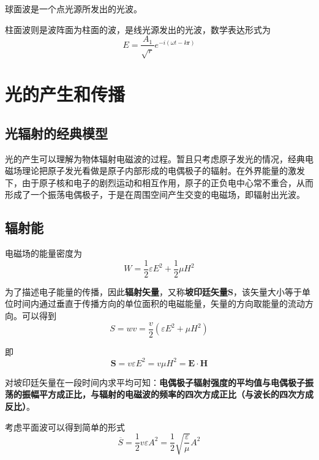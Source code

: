 \documentclass[UTF8]{ctexart}
\begin{document}
\noindent 球面波是一个点光源所发出的光波。

	柱面波则是波阵面为柱面的波，是线光源发出的光波，数学表达形式为
	\begin{equation}
		E=\frac{A_{1}}{\sqrt{r}} e^{-i(\omega t-k \boldsymbol{r})}
	\end{equation}
	
	\section{光的产生和传播}
	
	\subsection{光辐射的经典模型}
	光的产生可以理解为物体辐射电磁波的过程。暂且只考虑原子发光的情况，经典电磁场理论把原子发光看做是原子内部形成的电偶极子的辐射。在外界能量的激发下，由于原子核和电子的剧烈运动和相互作用，原子的正负电中心常不重合，从而形成了一个振荡电偶极子，于是在周围空间产生交变的电磁场，即辐射出光波。
	
	\subsection{辐射能}
	电磁场的能量密度为
	\begin{equation}
	W=\frac{1}{2} \varepsilon E^{2}+\frac{1}{2} \mu H^{2}
	\end{equation}
	
	为了描述电子能量的传播，因此\textbf{辐射矢量}，又称\textbf{坡印廷矢量S}，该矢量大小等于单位时间内通过垂直于传播方向的单位面积的电磁能量，矢量的方向取能量的流动方向。可以得到
	\begin{equation}
	S=w v=\frac{v}{2}\left(\varepsilon E^{2}+\mu H^{2}\right)
	\end{equation}
	
\noindent 即
\begin{equation}
\boldsymbol{S}=v \varepsilon E^{2}=v \mu H^{2}=\boldsymbol{E} \cdot \boldsymbol{H}
\end{equation}

	对坡印廷矢量在一段时间内求平均可知：\textbf{电偶极子辐射强度的平均值与电偶极子振荡的振幅平方成正比，与辐射的电磁波的频率的四次方成正比（与波长的四次方成反比）}。
	
	考虑平面波可以得到简单的形式
	\begin{equation}
		\overline{S}=\frac{1}{2} v \varepsilon A^{2} = \frac{1}{2} \sqrt{\frac{\varepsilon}{\mu}} A^{2}
	\end{equation}
	
\end{document}

